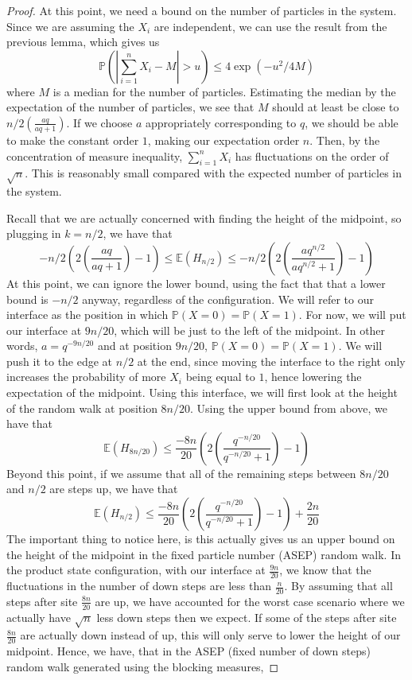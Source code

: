 \documentclass[12pt]{report}
\theoremstyle{definition}
\begin{document}
\begin{proof}
At this point, we need a bound on the number of particles in the system.  
Since we are assuming the $X_i$ are independent, we can use the result from the previous lemma, which gives us
$$
\mathbb{P}\left(\left |\sum_{i=1}^n X_i-M\right |>u\right)\leq 4\exp(-u^2/4M)
$$ 
where $M$ is a median for the number of particles.  Estimating the median by the expectation of the number of particles, we see that $M$ should at least be close to $n/2\left(\frac{aq}{aq+1}\right)$.  If we choose $a$ appropriately corresponding to $q$, we should be able to make the constant order $1$, making our expectation order $n$.  Then, by the concentration of measure inequality, $\sum_{i=1}^n X_i$  has  fluctuations on the order of $\sqrt{n}$.  This is reasonably small compared with the expected number of particles in the system. 

Recall that we are actually concerned with finding the height of the midpoint, so plugging in $k=n/2$, we have that 
$$
-n/2\left(2\left(\frac{aq}{aq+1}\right)-1\right)\leq\mathbb{E}(H_{n/2})\leq -n/2\left(2\left(\frac{aq^{n/2}}{aq^{n/2}+1}
\right)-1\right)
$$
At this point, we can ignore the lower bound, using the fact that that a lower bound is $-n/2$ anyway, regardless of the configuration.  We will refer to our interface as the position in which $\mathbb{P}(X=0)=\mathbb{P}(X=1)$.  For now, we will put our interface at $9n/20$, which will be just to the left of the midpoint.   In other words, $a=q^{-9n/20}$ and at position $9n/20$, $\mathbb{P}(X=0)=\mathbb{P}(X=1)$. We will push it to the edge at $n/2$ at the end, since moving the interface to the right only increases the probability of more $X_i$ being equal to $1$, hence lowering the expectation of the midpoint.  Using this interface, we will first look at the height of the random walk at position $8n/20$.  Using the upper bound from above, we have that 
$$
\mathbb{E}(H_{8n/20})\leq \frac{-8n}{20}\left(2\left(\frac{q^{-n/20}}{q^{-n/20}+1}\right)-1\right)
$$
Beyond this point, if we assume that all of the remaining steps between $8n/20$ and $n/2$ are steps up, we have that 
$$
\mathbb{E}(H_{n/2})\leq \frac{-8n}{20}\left(2\left(\frac{q^{-n/20}}{q^{-n/20}+1}\right)-1\right) + \frac{2n}{20}
$$
The important thing to notice here, is this actually gives us an upper bound on the height of the midpoint in the fixed particle number (ASEP) random walk.  In the product state configuration, with our interface at $\frac{9n}{20}$, we know that the fluctuations in the number of down steps are less than $\frac{n}{20}$.  By assuming that all steps after site $\frac{8n}{20}$ are up, we have accounted for the worst case scenario where we actually have $\sqrt{n}$ less down steps then we expect.  If some of the steps after site $\frac{8n}{20}$ are actually down instead of up, this will only serve to lower the height of our midpoint.  Hence, we have, that in the ASEP (fixed number of down steps) random walk generated using the blocking measures, 

\end{proof}
\end{document}
